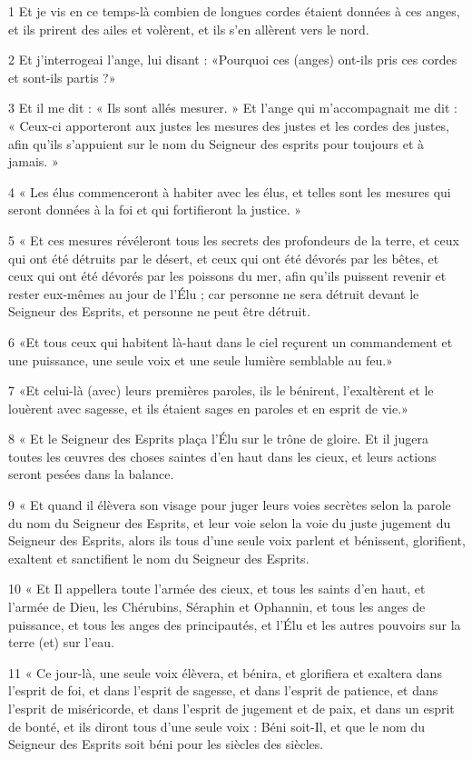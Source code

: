 \par 1 Et je vis en ce temps-là combien de longues cordes étaient données à ces anges, et ils prirent des ailes et volèrent, et ils s'en allèrent vers le nord.
\par 2 Et j'interrogeai l'ange, lui disant : «Pourquoi ces (anges) ont-ils pris ces cordes et sont-ils partis ?»
\par 3 Et il me dit : « Ils sont allés mesurer. » Et l’ange qui m’accompagnait me dit : « Ceux-ci apporteront aux justes les mesures des justes et les cordes des justes, afin qu’ils s’appuient sur le nom du Seigneur des esprits pour toujours et à jamais. »
\par 4 « Les élus commenceront à habiter avec les élus, et telles sont les mesures qui seront données à la foi et qui fortifieront la justice. »
\par 5 « Et ces mesures révéleront tous les secrets des profondeurs de la terre, et ceux qui ont été détruits par le désert, et ceux qui ont été dévorés par les bêtes, et ceux qui ont été dévorés par les poissons du mer, afin qu'ils puissent revenir et rester eux-mêmes au jour de l'Élu ; car personne ne sera détruit devant le Seigneur des Esprits, et personne ne peut être détruit.
\par 6 «Et tous ceux qui habitent là-haut dans le ciel reçurent un commandement et une puissance, une seule voix et une seule lumière semblable au feu.»
\par 7 «Et celui-là (avec) leurs premières paroles, ils le bénirent, l'exaltèrent et le louèrent avec sagesse, et ils étaient sages en paroles et en esprit de vie.»
\par 8 « Et le Seigneur des Esprits plaça l'Élu sur le trône de gloire. Et il jugera toutes les œuvres des choses saintes d’en haut dans les cieux, et leurs actions seront pesées dans la balance.
\par 9 « Et quand il élèvera son visage pour juger leurs voies secrètes selon la parole du nom du Seigneur des Esprits, et leur voie selon la voie du juste jugement du Seigneur des Esprits, alors ils tous d’une seule voix parlent et bénissent, glorifient, exaltent et sanctifient le nom du Seigneur des Esprits.
\par 10 « Et Il appellera toute l'armée des cieux, et tous les saints d'en haut, et l'armée de Dieu, les Chérubins, Séraphin et Ophannin, et tous les anges de puissance, et tous les anges des principautés, et l'Élu et les autres pouvoirs sur la terre (et) sur l'eau.
\par 11 « Ce jour-là, une seule voix élèvera, et bénira, et glorifiera et exaltera dans l'esprit de foi, et dans l'esprit de sagesse, et dans l'esprit de patience, et dans l'esprit de miséricorde, et dans l'esprit de jugement et de paix, et dans un esprit de bonté, et ils diront tous d’une seule voix : Béni soit-Il, et que le nom du Seigneur des Esprits soit béni pour les siècles des siècles.
